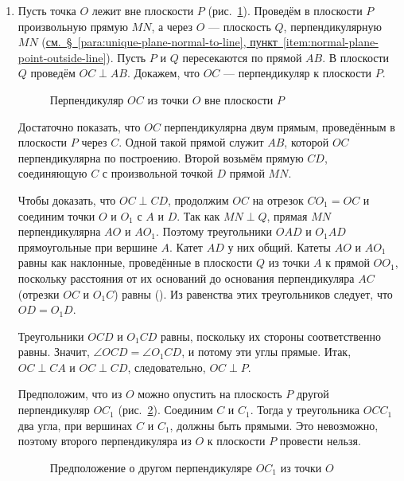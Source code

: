 \begin{enumerate}[label=\arabic*),ref=\arabic*]
    \item\label{item:normal-line-point-outside-plane} Пусть точка \(O\) лежит вне плоскости \(P\) (рис.~\ref{fig:kiselev-stereo-310}). Проведём в плоскости \(P\) произвольную прямую \(MN\), а через \(O\) --- плоскость \(Q\), перпендикулярную \(MN\) (\hyperref[item:normal-plane-point-outside-line]{см.~§~\ref*{para:unique-plane-normal-to-line}, пункт~\ref*{item:normal-plane-point-outside-line}}). Пусть \(P\) и \(Q\) пересекаются по прямой \(AB\). В плоскости \(Q\) проведём \(OC\perp AB\). Докажем, что \(OC\) --- перпендикуляр к плоскости \(P\).

    \begin{figure}[htbp]
        \centering
        \renewcommand{\thefigure}{310}
        \captionsetup{name=Рис.,labelsep=period}
        
        \caption{Перпендикуляр \(OC\) из точки \(O\) вне плоскости \(P\)}\label{fig:kiselev-stereo-310}
    \end{figure}

    Достаточно показать, что \(OC\) перпендикулярна двум прямым, проведённым в плоскости \(P\) через \(C\). Одной такой прямой служит \(AB\), которой \(OC\) перпендикулярна по построению. Второй возьмём прямую \(CD\), соединяющую \(C\) с произвольной точкой \(D\) прямой \(MN\).

    Чтобы доказать, что \(OC\perp CD\), продолжим \(OC\) на отрезок \(CO_1=OC\) и соединим точки \(O\) и \(O_1\) с \(A\) и \(D\). Так как \(MN\perp Q\), прямая \(MN\) перпендикулярна \(AO\) и \(AO_1\). Поэтому треугольники \(OAD\) и \(O_1AD\) прямоугольные при вершине \(A\). Катет \(AD\) у них общий. Катеты \(AO\) и \(AO_1\) равны как наклонные, проведённые в плоскости \(Q\) из точки \(A\) к прямой \(OO_1\), поскольку расстояния от их оснований до основания перпендикуляра \(AC\) (отрезки \(OC\) и \(O_1C\)) равны (). Из равенства этих треугольников следует, что \(OD=O_1D\).

    Треугольники \(OCD\) и \(O_1CD\) равны, поскольку их стороны соответственно равны.
    Значит, \(\angle OCD=\angle O_1CD\), и потому эти углы прямые. Итак, \(OC\perp CA\) и \(OC\perp CD\), следовательно, \(OC\perp P\).

    Предположим, что из \(O\) можно опустить на плоскость \(P\) другой перпендикуляр \(OC_1\) (рис.~\ref{fig:kiselev-stereo-311}). Соединим \(C\) и \(C_1\). Тогда у треугольника \(OCC_1\) два угла, при вершинах \(C\) и \(C_1\), должны быть прямыми. Это невозможно, поэтому второго перпендикуляра из \(O\) к плоскости \(P\) провести нельзя.

    \begin{figure}[htbp]
        \centering
        \renewcommand{\thefigure}{311}
        \captionsetup{name=Рис.,labelsep=period}
        
        \caption{Предположение о другом перпендикуляре \(OC_1\) из точки \(O\)}\label{fig:kiselev-stereo-311}
    \end{figure}
\end{enumerate}

